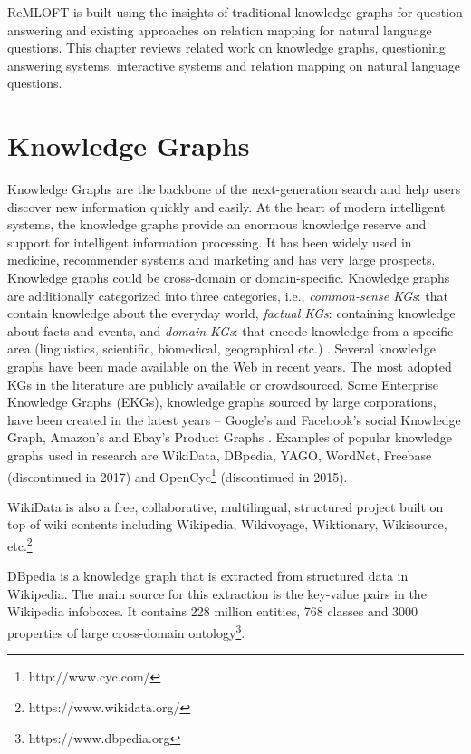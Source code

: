 ReMLOFT is built using the insights of traditional knowledge graphs for question answering and existing approaches on relation mapping for natural language questions. This chapter reviews related work on knowledge graphs, questioning answering systems, interactive systems and relation mapping on natural language questions.

\section{Knowledge Graphs}
Knowledge Graphs are the backbone of the next-generation search and help users discover new information quickly and easily. 
At the heart of modern intelligent systems, the knowledge graphs provide an enormous knowledge reserve and support for intelligent information processing. It has been widely used in medicine, recommender systems and marketing and has very large prospects. Knowledge graphs could be cross-domain or domain-specific. 
Knowledge graphs are additionally categorized into three categories, i.e., \textit{common-sense KGs}: that contain knowledge about the everyday world, \textit{factual KGs}: containing knowledge about facts and events, and \textit{domain KGs}: that encode knowledge from a specific area (linguistics, scientific, biomedical, geographical etc.) \cite{TIDDI2022103627}.
Several knowledge graphs have been made available on the Web in recent years. The most adopted KGs in the literature are publicly available or crowdsourced. Some Enterprise Knowledge Graphs (EKGs), knowledge graphs sourced by large corporations, have been created in the latest years – Google’s \footnotemark[\ref{google}] and Facebook’s social Knowledge Graph, Amazon’s and Ebay’s Product Graphs \cite{TIDDI2022103627}. Examples of popular knowledge graphs used in research are WikiData\cite{wikidata}, DBpedia\cite{dbpedia}, YAGO\cite{yago}, WordNet\cite{wordnet}, Freebase\cite{freebase} (discontinued in 2017) and OpenCyc\footnote{http://www.cyc.com/} (discontinued in 2015). 

WikiData is also a free, collaborative, multilingual, structured project built on top of wiki contents including Wikipedia, Wikivoyage, Wiktionary, Wikisource, etc.\footnote{https://www.wikidata.org/}

DBpedia is a knowledge graph that is extracted from structured data in Wikipedia. The main source for this extraction is the key-value pairs in the Wikipedia infoboxes. It contains 228 million entities, 768 classes and 3000 properties of large cross-domain ontology\footnote{\label{dbp}https://www.dbpedia.org}.

